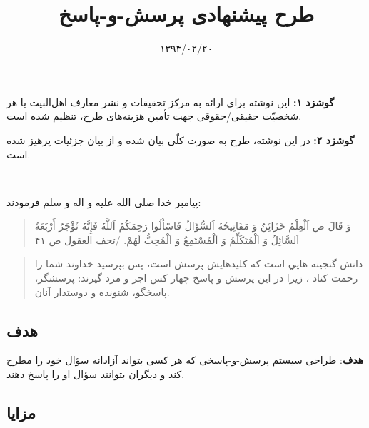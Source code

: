 \documentclass[]{article}
\title{طرح
پیشنهادی پرسش-و-پاسخ}
\author{}
\date{۱۳۹۴/۰۲/۲۰}
\begin{document}
\maketitle



\textbf{گوشزد ۱:} این نوشته برای ارائه به مرکز تحقیقات و نشر معارف
اهل‌البیت یا هر شخصیّت حقیقی/حقوقی جهت تأمین هزینه‌های طرح، تنظیم شده
است. 

\textbf{گوشزد ۲:} در این نوشته، طرح به صورت کلّی بیان شده و از بیان
جزئیات پرهیز شده است.

\

پیامبر خدا صلی الله علیه و اله و سلم فرمودند:
\begin{quote}
وَ قَالَ ص اَلْعِلْمُ خَزَائِنُ وَ مَفَاتِيحُهُ اَلسُّؤَالُ فَاسْأَلُوا
رَحِمَكُمُ اَللَّهُ فَإِنَّهُ تُؤْجَرُ أَرْبَعَةٌ اَلسَّائِلُ وَ
اَلْمُتَكَلِّمُ وَ اَلْمُسْتَمِعُ وَ اَلْمُحِبُّ لَهُمْ. /تحف العقول ص
۴۱
\end{quote}

\begin{quote}
دانش گنجينه هايي است كه كليدهايش پرسش است، پس بپرسيد-خداوند شما را رحمت
كناد ، زيرا در اين پرسش و پاسخ چهار كس اجر و مزد گيرند: پرسشگر، پاسخگو،
شنونده و دوستدار آنان.
\end{quote}

\subsection{هدف}\label{ux647ux62fux641}

\textbf{هدف}: طراحی سیستم پرسش-و-پاسخی که هر کسی بتواند آزادانه سؤال خود
را مطرح کند و دیگران بتوانند سؤال او را پاسخ دهند.

\subsection{مزایا}\label{ux645ux632ux627ux6ccux627}
\end{document}
